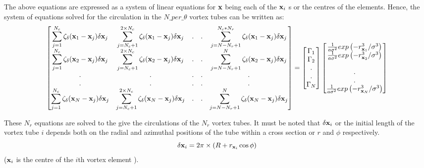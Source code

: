 \documentclass[10pt,a4paper]{report}
\newcommand{\xv}{{\bf x}}
\begin{document}
The above equations are expressed as a system of linear equations for $\xv$ being each of the $\xv_i$ s or the centres of the elements. Hence, the system of equations solved for the circulation in the $N\_per\_\theta$ vortex tubes can be written as:
\begin{dmath}
\begin{bmatrix}
\displaystyle \sum_{j=1}^{N_c} \zeta_\delta( \xv_1 - \xv_j) \delta \xv_j & \displaystyle \sum_{j=N_c + 1}^{2\times N_c} \zeta_\delta( \xv_1 - \xv_j) \delta \xv_j & . & . &  \displaystyle \sum_{j= N - N_r + 1}^{N_c*N_r} \zeta_\delta( \xv_1 - \xv_j) \delta \xv_j \\ 
\displaystyle \sum_{j=1}^{N_c} \zeta_\delta( \xv_2 - \xv_j) \delta \xv_j & \displaystyle \sum_{j=N_c + 1}^{2\times N_c} \zeta_\delta( \xv_2 - \xv_j) \delta \xv_j & . & . &  \displaystyle \sum_{j=N - N_r + 1}^{N} \zeta_\delta( \xv_2 - \xv_j) \delta \xv_j \\ 
. & . & . & . & . \\ 
. & . & . & . & . \\
\displaystyle \sum_{j=1}^{N_c} \zeta_\delta( \xv_N - \xv_j) \delta \xv_j & \displaystyle \sum_{j=N_c + 1}^{2\times N_c} \zeta_\delta( \xv_N - \xv_j) \delta \xv_j & . & . &  \displaystyle \sum_{j=N - N_r + 1}^N \zeta_\delta( \xv_N - \xv_j) \delta \xv_j \\ 
\end{bmatrix}
 = 
\begin{bmatrix}
\Gamma_1 \\
\Gamma_2 \\
. \\
. \\
\Gamma_N
\end{bmatrix}
\begin{bmatrix}
\frac{1}{a\sigma^2} exp\left(-r_{\xv_1}^3/\sigma^3\right) \\
\frac{1}{a\sigma^2} exp\left(-r_{\xv_2}^3/\sigma^3\right) \\ \\
. \\
. \\
\frac{1}{a\sigma^2} exp\left(-r_{\xv_N}^3/\sigma^3\right) \\
\end{bmatrix}
\end{dmath}

These $N_r$ equations are solved to the give the circulations of the $N_r$ vortex tubes.
It must be noted that $\delta \xv_i $ or the initial length of the vortex tube $i$ depends both on the radial and azimuthal positions of the tube within a cross section or $r$ and $\phi$ respectively.
\begin{equation}
\delta \xv_i = 2 \pi \times ( R + r_{\xv_i} \cos \phi ) 
\end{equation}
($ \xv_i $ is the centre of the $i$th vortex element ).
\end{document}
